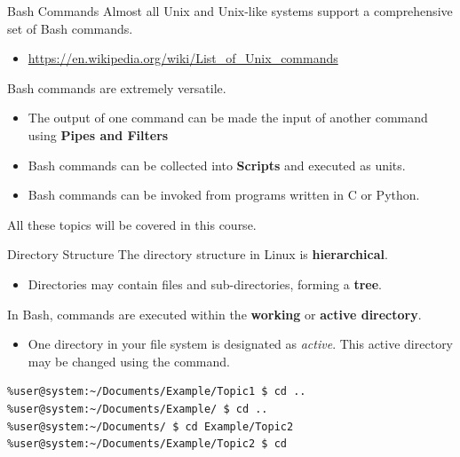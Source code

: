 \documentclass[11pt]{beamer}
\let\OldTexttt\texttt
\renewcommand{\texttt}[1]{\OldTexttt{\color{teal}{#1}}}
\begin{document}
\begin{frame}{Bash Commands}
Almost all Unix and Unix-like systems support a comprehensive set of Bash commands.
\begin{itemize}
\item \url{https://en.wikipedia.org/wiki/List_of_Unix_commands}
\end{itemize}
Bash commands are extremely versatile.
\begin{itemize}
\item The output of one command can be made the input of another command using \textbf{Pipes and Filters}
\item Bash commands can be collected into \textbf{Scripts} and executed as units.
\item Bash commands can be invoked from programs written in C or Python.
\end{itemize}
All these topics will be covered in this course.
\end{frame}

\begin{frame}[fragile=singleslide]{Directory Structure}
The directory structure in Linux is \textbf{hierarchical}.
\begin{itemize}
\item Directories may contain files and sub-directories, forming a \textbf{tree}.  
\end{itemize}
In Bash, commands are executed within the \textbf{working} or \textbf{active directory}.  
\begin{itemize}
\item One directory in your file system is designated as \emph{active}.  This active directory may be changed using the \texttt{cd} command.  
\end{itemize}
\begin{lstlisting}[style=C, language=bash]
%user@system:~/Documents/Example $ cd Topic1
%user@system:~/Documents/Example/Topic1 $ cd ..
%user@system:~/Documents/Example/ $ cd ..
%user@system:~/Documents/ $ cd Example/Topic2
%user@system:~/Documents/Example/Topic2 $ cd 
\end{lstlisting}

\end{frame}
\end{document}
